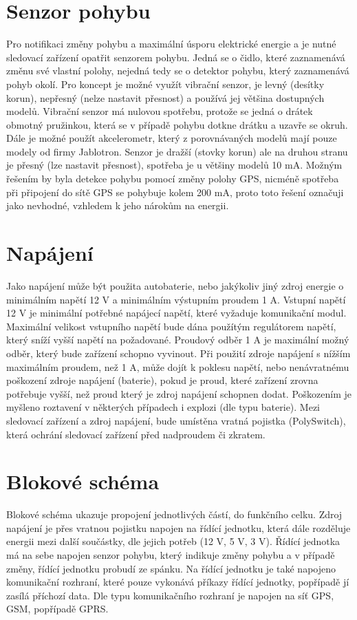 \documentclass[FM,BP]{tulthesis}  %
\begin{document}
\section{Senzor pohybu}
Pro notifikaci změny pohybu a maximální úsporu elektrické energie a je nutné sledovací zařízení opatřit senzorem pohybu. Jedná se o čidlo, které zaznamenává změnu své vlastní polohy, nejedná tedy se o detektor pohybu, který zaznamenává pohyb okolí. Pro koncept je možné využít vibrační senzor, je levný (desítky korun), nepřesný (nelze nastavit přesnost) a používá jej většina dostupných modelů. Vibrační senzor má nulovou spotřebu, protože se jedná o drátek obmotný pružinkou, která se v případě pohybu dotkne drátku a uzavře se okruh. Dále je možné použít akcelerometr, který z porovnávaných modelů mají pouze modely od firmy Jablotron. Senzor je dražší (stovky korun) ale na druhou stranu je přesný (lze nastavit přesnost), spotřeba je u většiny modelů 10 mA. Možným řešením by byla detekce pohybu pomocí změny polohy GPS, nicméně spotřeba při připojení do sítě GPS se pohybuje kolem 200 mA, proto toto řešení označuji jako nevhodné, vzhledem k jeho nárokům na energii.

\section{Napájení}
Jako napájení může být použita autobaterie, nebo jakýkoliv jiný zdroj energie o minimálním napětí 12 V a minimálním výstupním proudem 1 A. Vstupní napětí 12 V je minimální potřebné napájecí napětí, které vyžaduje komunikační modul. Maximální velikost vstupního napětí bude dána použítým regulátorem napětí, který sníží vyšší napětí na požadované. Proudový odběr 1 A je maximální možný odběr, který bude zařízení schopno vyvinout. Při použití zdroje napájení s nížším maximálním proudem, než 1 A, může dojít k poklesu napětí, nebo nenávratnému poškození zdroje napájení (baterie), pokud je proud, které zařízení zrovna potřebuje vyšší, než proud který je zdroj napájení schopnen dodat. Poškozením je myšleno roztavení v některých případech i explozi (dle typu baterie). Mezi sledovací zařízení a zdroj napájení, bude umístěna vratná pojistka (PolySwitch), která ochrání sledovací zařízení před nadproudem či zkratem. 

\section{Blokové schéma}
Blokové schéma ukazuje propojení jednotlivých částí, do funkčního celku. Zdroj napájení je přes vratnou pojistku napojen na řídící jednotku, která dále rozděluje energii mezi další součástky, dle jejich potřeb (12 V, 5 V, 3 V). Řídící jednotka má na sebe napojen senzor pohybu, který indikuje změny pohybu a v případě změny, řídící jednotku probudí ze spánku. Na řídící jednotku je také napojeno komunikační rozhraní, které pouze vykonává příkazy řídící jednotky, popřípadě jí zasílá příchozí data. Dle typu komunikačního rozhraní je napojen na síť GPS, GSM, popřípadě GPRS.
\end{document}

